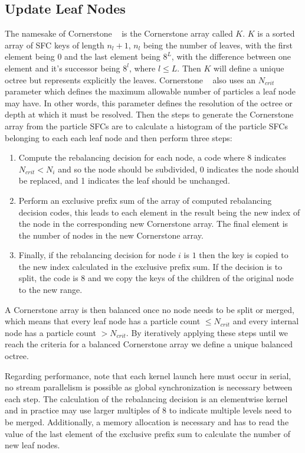 \subsection{Update Leaf Nodes}
The namesake of Cornerstone ~\cite{cornerstone} is the Cornerstone array called $K$. $K$ is a sorted array of SFC keys of length $n_l+1$, $n_l$ being the number of leaves, with the first element being $0$ and the last element being $8^L$, with the difference between one element and it's successor being $8^l$, where $l \le L$. Then $K$ will define a unique octree but represents explicitly the leaves. Cornerstone ~\cite{cornerstone} also uses an $N_{crit}$ parameter which defines the maximum allowable number of particles a leaf node may have. In other words, this parameter defines the resolution of the octree or depth at which it must be resolved. Then the steps to generate the Cornerstone array from the particle SFCs are to calculate a histogram of the particle SFCs belonging to each each leaf node and then perform three steps:
\begin{enumerate}
    \item Compute the rebalancing decision for each node, a code where 8 indicates $N_{crit} < N_i$ and so the node should be subdivided, 0 indicates the node should be replaced, and 1 indicates the leaf should be unchanged.
    \item Perform an exclusive prefix sum of the array of computed rebalancing decision codes, this leads to each element in the result being the new index of the node in the corresponding new Cornerstone array. The final element is the number of nodes in the new Cornerstone array.
    \item Finally, if the rebalancing decision for node $i$ is $1$ then the key is copied to the new index calculated in the exclusive prefix sum. If the decision is to split, the code is $8$ and we copy the keys of the children of the original node to the new range.
\end{enumerate}
A Cornerstone array is then balanced once no node needs to be split or merged, which means that every leaf node has a particle count $\le N_{crit}$ and every internal node has a particle count $> N_{crit}$. By iteratively applying these steps until we reach the criteria for a balanced Cornerstone array we define a unique balanced octree. 

Regarding performance, note that each kernel launch here must occur in serial, no stream parallelism is possible as global synchronization is necessary between each step. The calculation of the rebalancing decision is an elementwise kernel and in practice may use larger multiples of $8$ to indicate multiple levels need to be merged. Additionally, a memory allocation is necessary and has to read the value of the last element of the exclusive prefix sum to calculate the number of new leaf nodes. 

